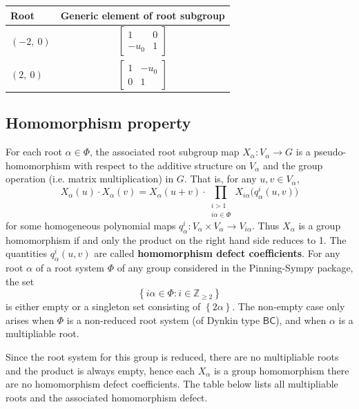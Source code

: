 \documentclass[11pt]{article}
\newcommand{\noi}{\noindent}
\newcommand{\tbf}{\textbf}
\newcommand{\lb}{\left\{}
\newcommand{\rb}{\right\}}
\newcommand{\Z}{\mathbb{Z}}
\theoremstyle{definition}
\newif\ifrootsystemreduced
\begin{document}
\noindent \begin{longtable}{|l|c|}
    \hline
    \textbf{Root} & \textbf{Generic element of root subgroup} \\
    \hline
    \endhead
    $\left( -2, \  0\right)$ & ${\left[\begin{matrix}1 & 0\\- u_{0} & 1\end{matrix}\right]}$ \\
    \hline
    $\left( 2, \  0\right)$ & ${\left[\begin{matrix}1 & - u_{0}\\0 & 1\end{matrix}\right]}$ \\
    \hline
\end{longtable}


\subsection{Homomorphism property}

\noi For each root $\alpha \in \Phi$, the associated root subgroup map $X_\alpha:V_\alpha \to G$ is a pseudo-homomorphism with respect to the additive structure on $V_\alpha$ and the group operation (i.e. matrix multiplication) in $G$. That is, for any $u,v \in V_\alpha$,
\begin{equation}
\label{pseudo homomorphism}
	X_\alpha(u) \cdot X_\alpha(v) = X_\alpha(u+v) \cdot \prod_{\substack{i > 1 \\ i \alpha \in \Phi}} X_{i \alpha} \Big( q^i_\alpha(u,v) \Big)
\end{equation}
for some homogeneous polynomial maps $q^i_\alpha:V_\alpha \times V_\alpha \to V_{i \alpha}$. Thus $X_\alpha$ is a group homomorphism if and only the product on the right hand side reduces to 1. The quantities $q^i_\alpha(u,v)$ are called \tbf{homomorphism defect coefficients}. For any root $\alpha$ of a root system $\Phi$ of any group considered in the Pinning-Sympy package, the set
\[
	\lb i \alpha \in \Phi : i \in \Z_{\ge 2} \rb
\]
is either empty or a singleton set consisting of $\lb 2 \alpha \rb$. The non-empty case only arises when $\Phi$ is a non-reduced root system (of Dynkin type $\mathsf{BC}$), and when $\alpha$ is a multipliable root. 

\ifrootsystemreduced
Since the root system for this group is reduced, there are no multipliable roots and the product is always empty, hence each $X_\alpha$ is a group homomorphism there are no homomorphism defect coefficients.
\else
The table below lists all multipliable roots and the associated homomorphism defect.
\end{document}

